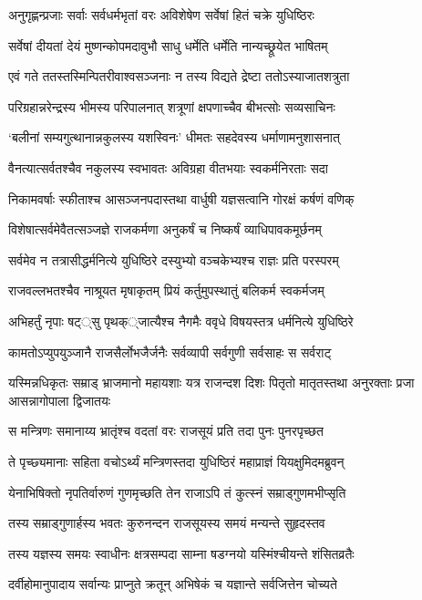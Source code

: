 \twolineshloka
{अनुगृह्णन्प्रजाः सर्वाः सर्वधर्मभृतां वरः}
{अविशेषेण सर्वेषां हितं चक्रे युधिष्ठिरः}


\twolineshloka
{सर्वेषां दीयतां देयं मुष्णन्कोपमदावुभौ}
{साधु धर्मेति धर्मेति नान्यच्छ्रूयेत भाषितम्}


\twolineshloka
{एवं गते ततस्तस्मिन्पितरीवाश्वसञ्जनाः}
{न तस्य विद्यते द्रेष्टा ततोऽस्याजातशत्रुता}


\twolineshloka
{परिग्रहान्नरेन्द्रस्य भीमस्य परिपालनात्}
{शत्रूणां क्षपणाच्चैव बीभत्सोः सव्यसाचिनः}


\twolineshloka
{`बलीनां सम्यगुत्थानान्नकुलस्य यशस्विनः'}
{धीमतः सहदेवस्य धर्माणामनुशासनात्}


\twolineshloka
{वैनत्यात्सर्वतश्चैव नकुलस्य स्वभावतः}
{अविग्रहा वीतभयाः स्वकर्मनिरताः सदा}


\twolineshloka
{निकामवर्षाः स्फीताश्च आसञ्जनपदास्तथा}
{वार्धुषी यज्ञसत्वानि गोरक्षं कर्षणं वणिक्}


\twolineshloka
{विशेषात्सर्वमेवैतत्सञ्जज्ञे राजकर्मणा}
{अनुकर्षं च निष्कर्षं व्याधिपावकमूर्छनम्}


\twolineshloka
{सर्वमेव न तत्रासीद्धर्मनित्ये युधिष्ठिरे}
{दस्युभ्यो वञ्चकेभ्यश्च राज्ञः प्रति परस्परम्}


\twolineshloka
{राजवल्लभतश्चैव नाश्रूयत मृषाकृतम्}
{प्रियं कर्तुमुपस्थातुं बलिकर्म स्वकर्मजम्}


\twolineshloka
{अभिहर्तुं नृपाः षट््सु पृथक््जात्यैश्च नैगमैः}
{ववृधे विषयस्तत्र धर्मनित्ये युधिष्ठिरे}


\twolineshloka
{कामतोऽप्युपयुञ्जानै राजसैर्लोभजैर्जनैः}
{सर्वव्यापी सर्वगुणी सर्वसाहः स सर्वराट्}


\threelineshloka
{यस्मिन्नधिकृतः सम्राड् भ्राजमानो महायशाः}
{यत्र राजन्दश दिशः पितृतो मातृतस्तथा}
{अनुरक्ताः प्रजा आसन्नागोपाला द्विजातयः}


\twolineshloka
{स मन्त्रिणः समानाय्य भ्रातृंश्च वदतां वरः}
{राजसूयं प्रति तदा पुनः पुनरपृच्छत}


\twolineshloka
{ते पृच्छ्यमानाः सहिता वचोऽर्थ्यं मन्त्रिणस्तदा}
{युधिष्ठिरं महाप्राज्ञं यियक्षुमिदमब्रुवन्}


\twolineshloka
{येनाभिषिक्तो नृपतिर्वारुणं गुणमृच्छति}
{तेन राजाऽपि तं कुत्स्नं सम्राड्गुणमभीप्सृति}


\twolineshloka
{तस्य सम्राड्गुणार्हस्य भवतः कुरुनन्दन}
{राजसूयस्य समयं मन्यन्ते सुहृदस्तव}


\twolineshloka
{तस्य यज्ञस्य समयः स्वाधीनः क्षत्रसम्पदा}
{साम्ना षडग्नयो यस्मिंश्चीयन्ते शंसितव्रतैः}


\twolineshloka
{दर्वीहोमानुपादाय सर्वान्यः प्राप्नुते क्रतून्}
{अभिषेकं च यज्ञान्ते सर्वजित्तेन चोच्यते}


